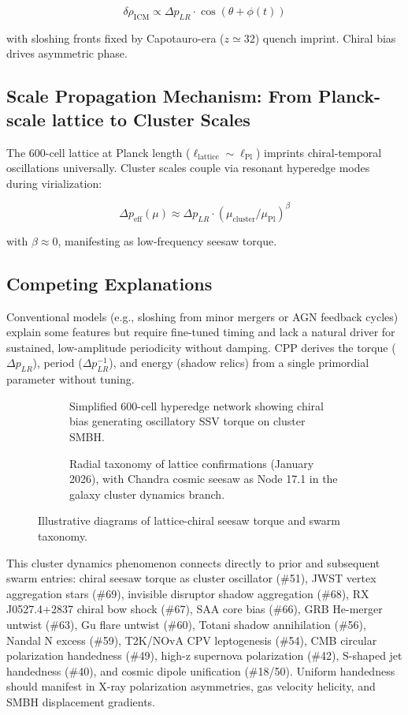 \documentclass[11pt]{article}
\begin{document}
\[
\delta \rho_{\text{ICM}} \propto \Delta p_{LR} \cdot \cos(\theta + \phi(t))
\]

with sloshing fronts fixed by Capotauro-era ($z \simeq 32$) quench imprint. Chiral bias drives asymmetric phase.

\subsection{Scale Propagation Mechanism: From Planck-scale lattice to Cluster Scales}
The 600-cell lattice at Planck length ($\ell_{\text{lattice}} \sim \ell_{\text{Pl}}$) imprints chiral-temporal oscillations universally. Cluster scales couple via resonant hyperedge modes during virialization:

\[
\Delta p_{\text{eff}}(\mu) \approx \Delta p_{LR} \cdot (\mu_{\text{cluster}} / \mu_{\text{Pl}})^\beta
\]

with $\beta \approx 0$, manifesting as low-frequency seesaw torque.

\subsection{Competing Explanations}
Conventional models (e.g., sloshing from minor mergers or AGN feedback cycles) explain some features but require fine-tuned timing and lack a natural driver for sustained, low-amplitude periodicity without damping. CPP derives the torque ($\Delta p_{LR}$), period ($\Delta p_{LR}^{-1}$), and energy (shadow relics) from a single primordial parameter without tuning.

\begin{figure}[htbp]
\centering
\begin{subfigure}{0.45\textwidth}
\centering
\caption{Simplified 600-cell hyperedge network showing chiral bias generating oscillatory SSV torque on cluster SMBH.}
\label{fig:chiral-seesaw}
\end{subfigure}
\hfill
\begin{subfigure}{0.45\textwidth}
\centering
\caption{Radial taxonomy of lattice confirmations (January 2026), with Chandra cosmic seesaw as Node 17.1 in the galaxy cluster dynamics branch.}
\label{fig:taxonomy}
\end{subfigure}
\caption{Illustrative diagrams of lattice-chiral seesaw torque and swarm taxonomy.}
\end{figure}

This cluster dynamics phenomenon connects directly to prior and subsequent swarm entries: chiral seesaw torque as cluster oscillator (\#51), JWST vertex aggregation stars (\#69), invisible disruptor shadow aggregation (\#68), RX J0527.4+2837 chiral bow shock (\#67), SAA core bias (\#66), GRB He-merger untwist (\#63), Gu flare untwist (\#60), Totani shadow annihilation (\#56), Nandal N excess (\#59), T2K/NOvA CPV leptogenesis (\#54), CMB circular polarization handedness (\#49), high-z supernova polarization (\#42), S-shaped jet handedness (\#40), and cosmic dipole unification (\#18/50). Uniform handedness should manifest in X-ray polarization asymmetries, gas velocity helicity, and SMBH displacement gradients.
\end{document}

